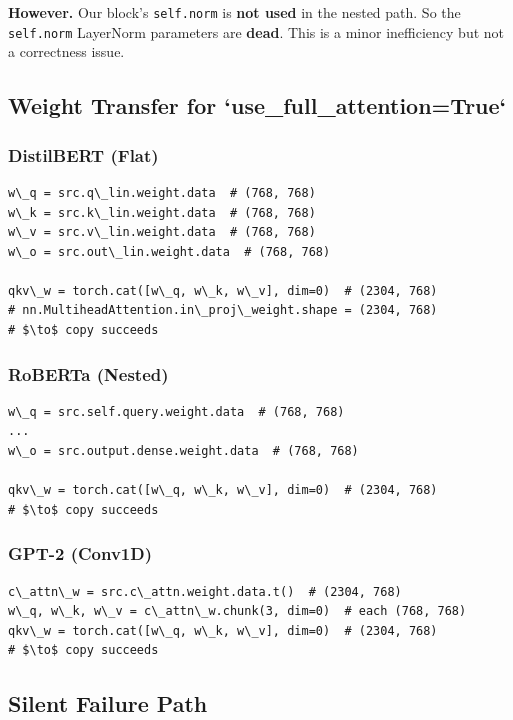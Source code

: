 \textbf{However.} Our block's \texttt{self.norm} is \textbf{not used} in the nested path. So 
the \texttt{self.norm} LayerNorm parameters are \textbf{dead}. This is a minor 
inefficiency but not a correctness issue.

\subsection{Weight Transfer for `use\_full\_attention=True`}

\subsubsection{DistilBERT (Flat)}

\begin{lstlisting}
w\_q = src.q\_lin.weight.data  # (768, 768)
w\_k = src.k\_lin.weight.data  # (768, 768)
w\_v = src.v\_lin.weight.data  # (768, 768)
w\_o = src.out\_lin.weight.data  # (768, 768)

qkv\_w = torch.cat([w\_q, w\_k, w\_v], dim=0)  # (2304, 768)
# nn.MultiheadAttention.in\_proj\_weight.shape = (2304, 768)
# $\to$ copy succeeds
\end{lstlisting}

\subsubsection{RoBERTa (Nested)}

\begin{lstlisting}
w\_q = src.self.query.weight.data  # (768, 768)
...
w\_o = src.output.dense.weight.data  # (768, 768)

qkv\_w = torch.cat([w\_q, w\_k, w\_v], dim=0)  # (2304, 768)
# $\to$ copy succeeds
\end{lstlisting}

\subsubsection{GPT-2 (Conv1D)}

\begin{lstlisting}
c\_attn\_w = src.c\_attn.weight.data.t()  # (2304, 768)
w\_q, w\_k, w\_v = c\_attn\_w.chunk(3, dim=0)  # each (768, 768)
qkv\_w = torch.cat([w\_q, w\_k, w\_v], dim=0)  # (2304, 768)
# $\to$ copy succeeds
\end{lstlisting}

\subsection{Silent Failure Path}


